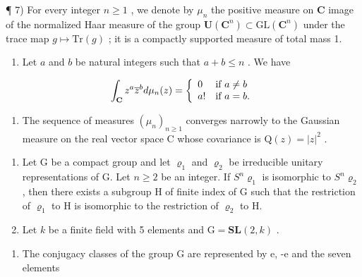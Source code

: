 ¶ 7) For every integer \(n \geqslant 1\) , we denote by \(\mu_n\) the positive measure on \(\mathbf{C}\) image of the normalized Haar measure of the group \(\mathbf{U}(\mathbf{C}^n) \subset \mathrm{GL}(\mathbf{C}^n)\) under the trace map \(g \mapsto \mathrm{Tr}(g)\) ; it is a compactly supported measure of total mass 1.

\begin{enumerate}
\def\labelenumi{\alph{enumi})}
\tightlist
\item
  Let \(a\) and \(b\) be natural integers such that \(a + b \leqslant n\) . We have
\end{enumerate}

\[
\int_ {\mathbf {C}} z ^ {a} \overline {{z}} ^ {b} d \mu_ {n} (z) = \left\{ \begin{array}{l l} 0 & \text{if } a \neq b \\ a! & \text{if } a = b. \end{array} \right.
\]

\begin{enumerate}
\def\labelenumi{\alph{enumi})}
\setcounter{enumi}{1}
\tightlist
\item
  The sequence of measures \((\mu_{n})_{n\geqslant1}\) converges narrowly to the Gaussian measure on the real vector space C whose covariance is \(\mathrm{Q}(z)=|z|^{2}\) .
\end{enumerate}

\begin{enumerate}
\def\labelenumi{\arabic{enumi})}
\setcounter{enumi}{7}
\item
  Let G be a compact group and let \(\varrho_{1}\) and \(\varrho_{2}\) be irreducible unitary representations of G. Let \(n \geqslant 2\) be an integer. If \(S^{n}\varrho_{1}\) is isomorphic to \(S^{n}\varrho_{2}\) , then there exists a subgroup H of finite index of G such that the restriction of \(\varrho_{1}\) to H is isomorphic to the restriction of \(\varrho_{2}\) to H.
\item
  Let \(k\) be a finite field with 5 elements and \(\mathrm{G} = \mathbf{S}\mathbf{L}(2,k)\) .
\end{enumerate}

\begin{enumerate}
\def\labelenumi{\alph{enumi})}
\tightlist
\item
  The conjugacy classes of the group G are represented by e, -e and the seven elements
\end{enumerate}

